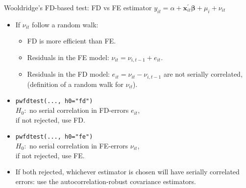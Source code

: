 \documentclass{beamer}
\begin{document}
\begin{frame}{Wooldridge's FD-based test: FD vs FE estimator}
$y_{it} = \alpha + \bm{x}^{\prime}_{it} \bm{\beta} + \mu_i + \nu_{it}$\\ \medskip
\begin{itemize}
    \item If $\nu_{it}$ follow a random walk: 
    \begin{itemize}
          \item FD is more efficient than FE.
          \item Residuals in the FE model: $\nu_{it}=\nu_{i,t-1}+e_{it}$.
          \item Residuals in the FD model: $e_{it} = \nu_{it}-\nu_{i,t-1}$ are not serially correlated, \\(definition of a random walk for $\nu_{it}$).
        \end{itemize}
        \smallskip
        \item \texttt{pwfdtest(..., h0="fd")} \\
        $H_0:$ no serial correlation in FD-errors $e_{it}$, \\if not rejected, use FD.
        \smallskip
        \item \texttt{pwfdtest(..., h0="fe")} \\
        $H_0:$ no serial correlation in FE-errors $\nu_{it}$, \\if not rejected, use FE.
        \smallskip
        \item If both rejected, whichever estimator is chosen will have serially correlated errors: use the autocorrelation-robust covariance estimators.
    \smallskip
\end{itemize}
\end{frame}
\end{document}

